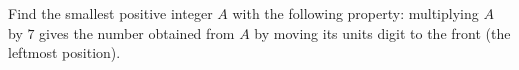 Find the smallest positive integer $A$ with the following property: multiplying $A$ by $7$ gives the number obtained from $A$ by moving its units digit to the front (the leftmost position).
